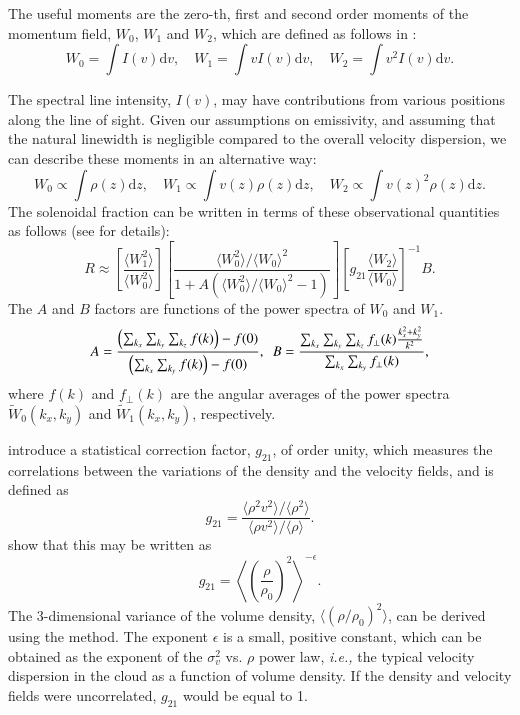 \documentclass[structabstract]{aa}
\newcommand{\ie}{{\em i.e.,}}
\begin{document}
The useful moments are the zero-th, first and second order moments of the momentum field, $W_0$, $W_1$ and $W_2$, which are defined as follows in \citet{brunt14}:
\begin{equation}
  W_0 = \!\int\!\!I(v) \mathrm{d}v, \quad W_1 = \!\int\!\! v I(v) \mathrm{d}v, \quad W_2 = \!\int\!\! v^2 I(v) \mathrm{d}v.
\end{equation}

The spectral line intensity, $I(v)$, may have contributions from various positions along the line of sight. Given our assumptions on emissivity, and assuming that the natural linewidth is negligible compared to the overall velocity dispersion, we can describe these moments in an alternative way:
\begin{equation}
  W_0 \propto \!\int\!\!\rho(z) \mathrm{d}z, \quad W_1 \propto \!\int\!\! v(z) \rho(z) \mathrm{d}z, \quad W_2 \propto \!\int\!\! v(z)^2 \rho(z) \mathrm{d}z.
\end{equation}
The solenoidal fraction can be written in terms of these observational quantities as follows (see \citet{brunt14} for details):
\begin{equation}
  \label{eq:R}
  R \approx \left[\frac{\langle W_1^2 \rangle}{\langle W_0^2\rangle}\right]\! \left[\frac{\langle W_0^2 \rangle / {\langle W_0 \rangle}^2}{1 + A (\langle W_0^2 \rangle / {\langle W_0 \rangle}^2-1)}\right]\! \left[ g_{21}\frac{\langle W_2\rangle}{\langle W_0\rangle}\right]^{-1}\!\!\! B.
\end{equation}
The $A$ and $B$ factors are functions of the power spectra of $W_0$ and $W_1$.
\begin{equation}
  \label{eq:AB}
 A = \frac{\left(\sum_{k_x}\sum_{k_y}\sum_{k_z}f(k)\right)-f(0)}{\left(\sum_{k_x}\sum_{k_y}f(k)\right)-f(0)}, \enskip B = \frac{\sum_{k_x}\sum_{k_y}\sum_{k_z}f_{\perp}(k)\frac{k_x^2+k_y^2}{k^2}}{\sum_{k_x}\sum_{k_y}f_{\perp}(k)},
\end{equation}
where $f(k)$  and $f_{\perp}(k)$ are the angular averages of the power spectra $\tilde{W}_0(k_x,k_y)$ and $\tilde{W}_1(k_x,k_y)$, respectively.

\citet{brunt14} introduce a statistical correction factor, $g_{21}$, of order unity, which measures the correlations between the variations of the density and the velocity fields, and is defined as
\begin{equation}
 g_{21} = \frac{\langle \rho^2 v^2 \rangle / \langle \rho^2 \rangle}{\langle \rho v^2 \rangle / \langle \rho \rangle}.
\end{equation}
\citet{brunt14} show that this may be written as
\begin{equation}
 \label{eq:g21}
 g_{21} = \left\langle\left(\frac{\rho}{\rho_0}\right)^2\right\rangle^{-\epsilon}.
\end{equation}
The 3-dimensional variance of the volume density, $\langle (\rho/\rho_0)^2\rangle$, can be derived using the \cite{brunt10} method. The exponent $\epsilon$ is a small, positive constant, which can be obtained as the exponent of the $\sigma_v^2$ vs. $\rho$ power law, \ie{} the typical velocity dispersion in the cloud as a function of volume density. If the density and velocity fields were uncorrelated, $g_{21}$ would be equal to 1.
\end{document}
